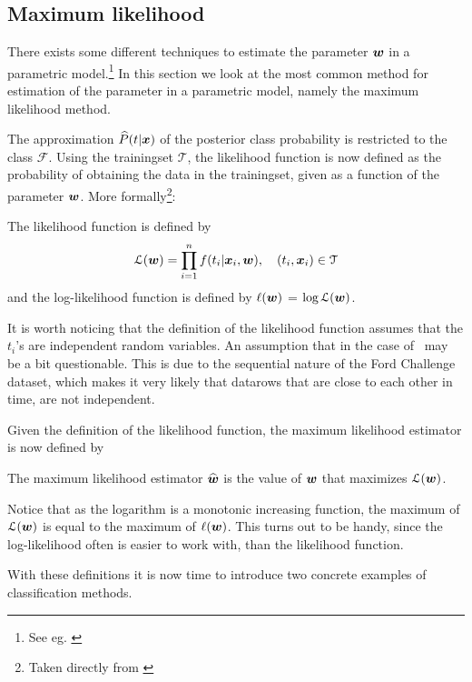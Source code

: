 \subsection{Maximum likelihood}
There exists some different techniques to estimate the parameter $\boldsymbol{w}$ in a parametric model.\footnote{See eg. \citet[Sec.9]{wasserman04}} In this section we look at the most common method for estimation of the parameter in a parametric model, namely the maximum likelihood method.\par
The approximation $\widehat{P}(t|\boldsymbol{x})$ of the posterior class probability is restricted to the class $\mathcal{F}$. Using the trainingset $\mathcal{T}$, the likelihood function is now defined as the probability of obtaining the data in the trainingset, given as a function of the parameter $\boldsymbol{w}$. More formally\footnote{Taken directly from \citet[p.122]{wasserman04}}:
\begin{definition}
    The likelihood function is defined by
    \[
    \mathcal{L}(\boldsymbol{w}) = \prod_{i=1}^n f(t_i|\boldsymbol{x}_i,\boldsymbol{w}),\quad (t_i,\boldsymbol{x}_i)\in\mathcal{T}
    \]
    and the log-likelihood function is defined by $\ell(\boldsymbol{w})$ = $\log\mathcal{L(\boldsymbol{w})}$.
\end{definition}
It is worth noticing that the definition of the likelihood function assumes that the $t_i$'s are independent random variables. An assumption that in the case of \TFC\ may be a bit questionable. This is due to the sequential nature of the Ford Challenge dataset, which makes it very likely that datarows that are close to each other in time, are not independent.\par
Given the definition of the likelihood function, the maximum likelihood estimator is now defined by
\begin{definition}
    The maximum likelihood estimator $\widehat{\boldsymbol{w}}$ is the value of $\boldsymbol{w}$ that maximizes $\mathcal{L}(\boldsymbol{w})$.
\end{definition}
Notice that as the logarithm is a monotonic increasing function, the maximum of $\mathcal{L}(\boldsymbol{w})$ is equal to the maximum of $\ell(\boldsymbol{w})$. This turns out to be handy, since the log-likelihood often is easier to work with, than the likelihood function. \par
With these definitions it is now time to introduce two concrete examples of classification methods.



